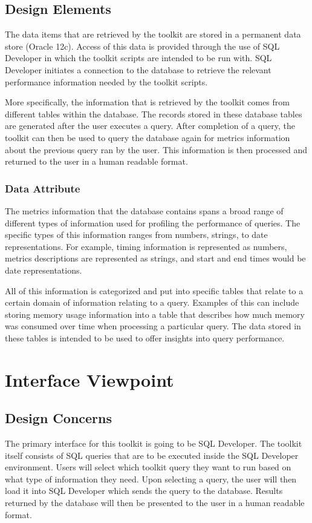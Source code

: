 \documentclass[draftclsnofoot, onecolumn, compsoc, 10pt]{IEEEtran}
\begin{document}
\subsection{Design Elements}
The data items that are retrieved by the toolkit are stored in a permanent data store (Oracle 12c).
Access of this data is provided through the use of SQL Developer in which the toolkit scripts are intended to be run with.
SQL Developer initiates a connection to the database to retrieve the relevant performance information needed by the toolkit scripts. 

More specifically, the information that is retrieved by the toolkit comes from different tables within the database.
The records stored in these database tables are generated after the user executes a query.
After completion of a query, the toolkit can then be used to query the database again for metrics information about the previous query ran by the user.
This information is then processed and returned to the user in a human readable format.

\subsubsection{Data Attribute}
The metrics information that the database contains spans a broad range of different types of information used for profiling the performance of queries.
The specific types of this information ranges from numbers, strings, to date representations.
For example, timing information is represented as numbers, metrics descriptions are represented as strings, and start and end times would be date representations.

All of this information is categorized and put into specific tables that relate to a certain domain of information relating to a query.
Examples of this can include storing memory usage information into a table that describes how much memory was consumed over time when processing a particular query.
The data stored in these tables is intended to be used to offer insights into query performance.

\section{Interface Viewpoint}
\subsection{Design Concerns}
The primary interface for this toolkit is going to be SQL Developer. 
The toolkit itself consists of SQL queries that are to be executed inside the SQL Developer environment.
Users will select which toolkit query they want to run based on what type of information they need. Upon selecting a query, the user will then load it into SQL Developer which sends the query to the database.
Results returned by the database will then be presented to the user in a human readable format.
\end{document}
